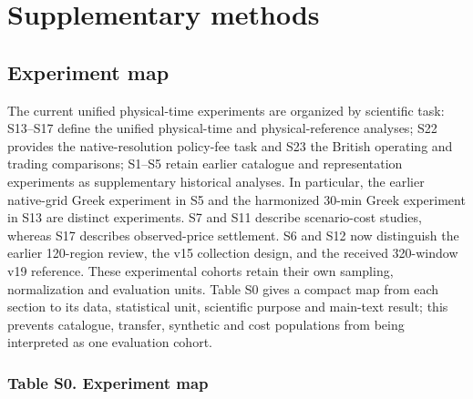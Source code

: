 \documentclass[a4paper,11pt]{article}
\begin{document}
\section{Supplementary methods}\label{supplementary-methods}

\subsection{Experiment map}\label{experiment-map}

The current unified physical-time experiments are organized by scientific task: S13--S17 define the unified physical-time and physical-reference analyses; S22 provides the native-resolution policy-fee task and S23 the British operating and trading comparisons; S1--S5 retain earlier catalogue and representation experiments as supplementary historical analyses. In particular, the earlier native-grid Greek experiment in S5 and the harmonized 30-min Greek experiment in S13 are distinct experiments. S7 and S11 describe scenario-cost studies, whereas S17 describes observed-price settlement. S6 and S12 now distinguish the earlier 120-region review, the v15 collection design, and the received 320-window v19 reference. These experimental cohorts retain their own sampling, normalization and evaluation units. Table S0 gives a compact map from each section to its data, statistical unit, scientific purpose and main-text result; this prevents catalogue, transfer, synthetic and cost populations from being interpreted as one evaluation cohort.

\subsubsection{Table S0. Experiment map}\label{table-s0.-experiment-map}
\end{document}

